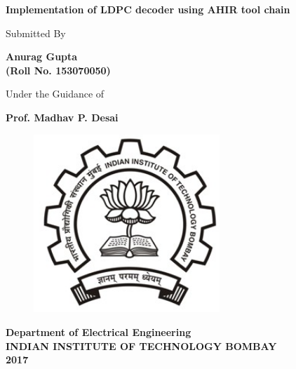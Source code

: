 \documentclass[twopage,12pt,a4paper]{report}
\begin{document}
\begin{raggedright}
\justify
\thispagestyle{empty}
\begin{center}

\huge
\textbf{ Implementation of LDPC decoder using AHIR tool chain  }\\
\bigskip
\bigskip
\bigskip

\normalsize

\vspace*{3cm}

\begin{Large}
Submitted By\\
\end{Large}

\begin{LARGE}
\textbf{Anurag Gupta\\(Roll No. 153070050)}\\
\end{LARGE}
\begin{Large}
Under the Guidance of\\ 
\end{Large}
\vspace*{4mm}
\begin{LARGE}
\textbf{Prof. Madhav P. Desai}
\end{LARGE}
\bigskip

\begin{figure}[h!]
 \centering
 \includegraphics[width=7cm]{iitb}

\end{figure}



\large
\textbf{Department of Electrical Engineering}\\
\bigskip
\textbf{INDIAN INSTITUTE OF TECHNOLOGY BOMBAY}\\
\bigskip
\textbf{2017}
\end{center}


\end{raggedright}
\end{document}
